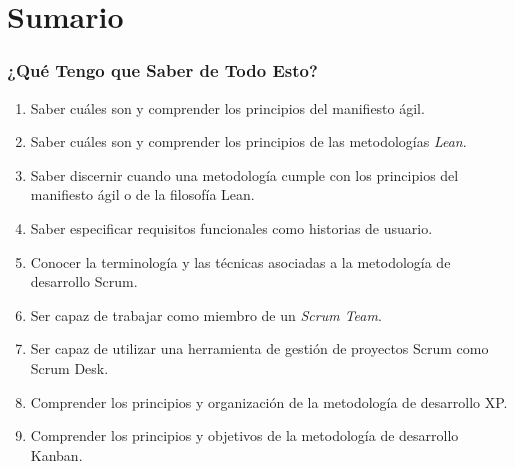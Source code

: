 \documentclass[animated,a4paper,slidestop,xcolor=pst,blue]{beamer}
\begin{document}



\section{Sumario}

\begin{frame}[c]
    \frametitle{¿Qué Tengo que Saber de Todo Esto?}
    \begin{enumerate}[<+->]
        \item Saber cuáles son y comprender los principios del manifiesto ágil.
        \item Saber cuáles son y comprender los principios de las metodologías \emph{Lean}.
        \item Saber discernir cuando una metodología cumple con los principios del manifiesto ágil o de la filosofía Lean.
        \item Saber especificar requisitos funcionales como historias de usuario.
        \item Conocer la terminología y las técnicas asociadas a la metodología de desarrollo \alert{Scrum}.
        \item Ser capaz de trabajar como miembro de un \emph{Scrum Team}.
        \item Ser capaz de utilizar una herramienta de gestión de proyectos Scrum como \alert{Scrum Desk}.
        \item Comprender los principios y organización de la metodología de desarrollo XP.
        \item Comprender los principios y objetivos de la metodología de desarrollo Kanban.
    \end{enumerate}
\end{frame}

%
%	
%    
\end{document}
